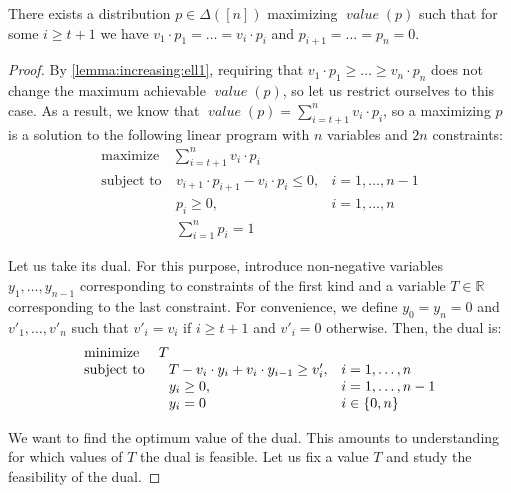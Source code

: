 \documentclass[sigconf,nonacm]{aamas}
\DeclareMathOperator{\valueText}{\textit{value}}
\newcommand{\val}[1]{\valueText({#1})}
\begin{document}
\begin{lemma}\label{lemma:exact-shape-ell-one} There exists a distribution $p \in \Delta\left([n]\right)$ maximizing $\val{p}$ such that for some $i \geq t + 1$ we have $v_1 \cdot p_1 = \dots = v_i \cdot p_i$ and $p_{i + 1} = \dots = p_n = 0$. 
\end{lemma}

\begin{proof} By \cref{lemma:increasing:ell1}, requiring that $v_1 \cdot p_1 \geq \dots \geq v_n \cdot p_n$ does not change the maximum achievable $\val{p}$, so let us restrict ourselves to this case. As a result, we know that $\val{p} = \sum_{i = t + 1}^n v_i \cdot p_i$, so a maximizing $p$ is a solution to the following linear program with $n$ variables and $2n$ constraints:%
%
\begin{equation*}
\begin{array}{lll}
\text{maximize}  & \sum_{i = t + 1}^n v_i \cdot p_i &\\
\text{subject to}& \ v_{i + 1} \cdot p_{i + 1} - v_i \cdot p_i \leq 0, & i = 1, \dots, n - 1 \\ 
                 & \ p_i \geq 0, & i = 1, \dots, n \\
                 & \ \displaystyle\sum_{i = 1}^{n} p_i = 1
\end{array}
\end{equation*}

Let us take its dual. For this purpose, introduce non-negative variables $y_1, \dots, y_{n - 1}$ corresponding to constraints of the first kind and a variable $T \in \mathbb{R}$ corresponding to the last constraint. For convenience, we define $y_0 = y_n = 0$ and $v'_1, \dots, v'_n$ such that $v'_i = v_i$ if $i \geq t + 1$ and $v'_i = 0$ otherwise. Then, the dual is:%
%
\begin{equation*}
\begin{array}{ll@{}ll}
\text{minimize}  & T & & \\
\text{subject to}& & T - v_i \cdot y_i + v_i \cdot y_{i - 1} \geq v'_i, & i = 1, \dots, n \\ 
                 & & y_i \geq 0, & i = 1, \dots, n - 1 \\
                 & & y_i = 0     & i \in \{0, n\}
\end{array}
\end{equation*}

We want to find the optimum value of the dual. This amounts to understanding for which values of $T$ the dual is feasible. Let us fix a value $T$ and study the feasibility of the dual. 


\end{proof}
\end{document}

